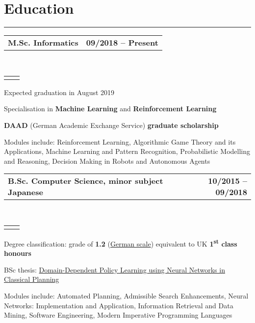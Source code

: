 \documentclass[]{deedy-resume}
\makeatletter
\newcommand{\headerrow}[2]
{\begin{tabular*}{\linewidth}{l@{\extracolsep{\fill}}r}
	\fontspec{Helvetica}\fontsize{12pt}{12pt}\selectfont\bfseries{\color{subheadings}#1} &
	\fontspec{Helvetica}\fontsize{12pt}{12pt}\selectfont\bfseries{\color{subheadings}#2} \\
\end{tabular*}}
\newcommand{\locationrow}[2]
{\begin{tabular*}{\linewidth}{l@{\extracolsep{\fill}}r}
        \color{headings}\scshape\fontspec{Heiti TC Medium}\fontsize{10pt}{12pt}\selectfont{#1}  &
        \color{headings}\scshape\fontspec{Heiti TC Medium}\fontsize{10pt}{12pt}\selectfont{#2}  \\
\end{tabular*}}
\makeatother
\begin{document}
\section*{Education}
\hrule
\vspace{0.4em}

\noindent
\headerrow{M.Sc. Informatics}{09/2018 -- Present}
\\
\locationrow{University of Edinburgh}{Edinburgh, United Kingdom}
\begin{tightitemize}{1.7em}
    \item Expected graduation in August 2019
    \item Specialisation in \textbf{Machine Learning} and \textbf{Reinforcement Learning}
    \item \textbf{DAAD} (German Academic Exchange Service) \textbf{graduate scholarship}
    \item Modules include: Reinforcement Learning, Algorithmic Game Theory and its Applications, Machine Learning and 
    Pattern Recognition, Probabilistic Modelling and Reasoning, Decision Making in Robots and Autonomous Agents
\end{tightitemize}
\largesectionsep

\noindent
\headerrow{B.Sc. Computer Science, minor subject Japanese}{10/2015 -- 09/2018}
\\
\locationrow{Saarland University}{Saarbrücken, Germany}
\begin{tightitemize}{1.7em}
    \item Degree classification: grade of \textbf{1.2} (\href{https://en.wikipedia.org/wiki/Academic_grading_in_Germany}{German scale}) equivalent to UK \textbf{1\textsuperscript{st} class honours}
    \item BSc thesis: \href{https://www.lukaschaefer.de/assets/files/thesis.pdf}{Domain-Dependent Policy Learning using Neural Networks in Classical Planning}
    \item Modules include: Automated Planning, Admissible Search Enhancements, Neural Networks: Implementation and Application, Information Retrieval and Data Mining, Software Engineering, Modern Imperative Programming Languages
\end{tightitemize}
\largesectionsep
\end{document}
